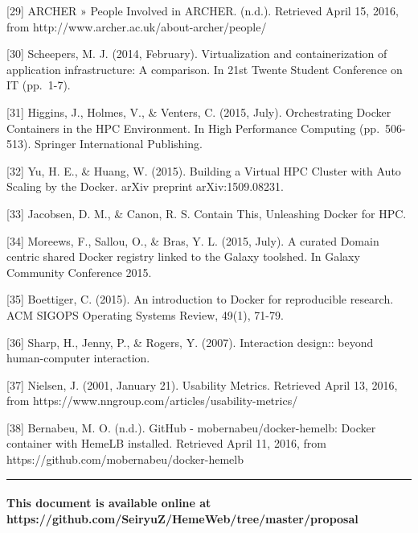 \documentclass[]{article}
\let\oldparagraph\paragraph
\renewcommand{\paragraph}[1]{\oldparagraph{#1}\mbox{}}
\begin{document}
{[}29{]} ARCHER » People Involved in ARCHER. (n.d.). Retrieved April 15,
2016, from http://www.archer.ac.uk/about-archer/people/

{[}30{]} Scheepers, M. J. (2014, February). Virtualization and
containerization of application infrastructure: A comparison. In 21st
Twente Student Conference on IT (pp.~1-7).

{[}31{]} Higgins, J., Holmes, V., \& Venters, C. (2015, July).
Orchestrating Docker Containers in the HPC Environment. In High
Performance Computing (pp.~506-513). Springer International Publishing.

{[}32{]} Yu, H. E., \& Huang, W. (2015). Building a Virtual HPC Cluster
with Auto Scaling by the Docker. arXiv preprint arXiv:1509.08231.

{[}33{]} Jacobsen, D. M., \& Canon, R. S. Contain This, Unleashing
Docker for HPC.

{[}34{]} Moreews, F., Sallou, O., \& Bras, Y. L. (2015, July). A curated
Domain centric shared Docker registry linked to the Galaxy toolshed. In
Galaxy Community Conference 2015.

{[}35{]} Boettiger, C. (2015). An introduction to Docker for
reproducible research. ACM SIGOPS Operating Systems Review, 49(1),
71-79.

{[}36{]} Sharp, H., Jenny, P., \& Rogers, Y. (2007). Interaction
design:: beyond human-computer interaction.

{[}37{]} Nielsen, J. (2001, January 21). Usability Metrics. Retrieved
April 13, 2016, from https://www.nngroup.com/articles/usability-metrics/

{[}38{]} Bernabeu, M. O. (n.d.). GitHub - mobernabeu/docker-hemelb:
Docker container with HemeLB installed. Retrieved April 11, 2016, from
https://github.com/mobernabeu/docker-hemelb

\begin{center}\rule{0.5\linewidth}{\linethickness}\end{center}

\paragraph{This document is available online at
https://github.com/SeiryuZ/HemeWeb/tree/master/proposal}\label{this-document-is-available-online-at-httpsgithub.comseiryuzhemewebtreemasterproposal}
\end{document}
